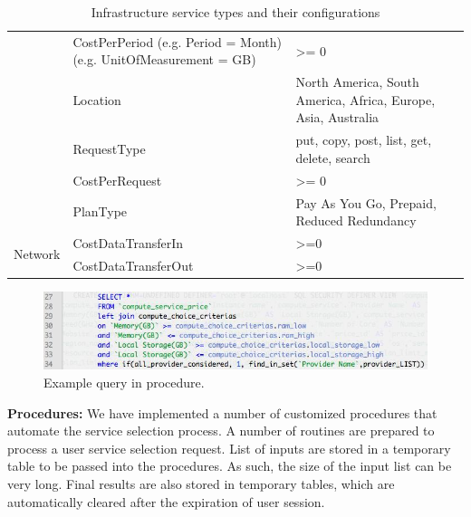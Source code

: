 \begin{table}
\begin{tabular}{|l|p{5.5cm}|p{5.5cm}|}
                         & CostPerPeriod (e.g. Period = Month) (e.g. UnitOfMeasurement = GB) & >= 0                                                          \\ \cline{2-3} 
                         & Location                                                          & North America, South America, Africa, Europe, Asia, Australia \\ \cline{2-3} 
                         & RequestType                                                       & put, copy, post, list, get, delete, search                    \\ \cline{2-3} 
                         & CostPerRequest                                                    & >= 0                                                          \\ \cline{2-3} 
                         & PlanType                                                          & Pay As You Go, Prepaid, Reduced Redundancy                    \\ \hline
\multirow{2}{*}{Network} & CostDataTransferIn                                                & >=0                                                           \\ \cline{2-3} 
                         & CostDataTransferOut                                               & >=0                                                           \\ \hline
\end{tabular}
\caption{Infrastructure service types and their configurations}
\label{table:IaaSConfigurations}
\end{table}

\begin{figure}
  \includegraphics[width=\textwidth,keepaspectratio]{Figures/system/CloudRecommender/sql.jpg}
  \caption{Example query in procedure.}
  \label{fig:ExampleQueryProcedure}
\end{figure}

\textbf{Procedures:} We have implemented a number of customized procedures that automate the service selection process. A number of routines are prepared to process a user service selection request. List of inputs are stored in a temporary table to be passed into the procedures. As such, the size of the input list can be very long.
Final results are also stored in temporary tables, which are automatically cleared after the expiration of user session.

